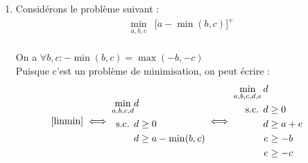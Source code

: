 \documentclass[a4paper,12pt]{article}
\begin{document}
\begin {enumerate}
\item{
    Considérons le problème suivant :
    \begin{equation}
        \begin{aligned}
            \min _{a, b, c} & \lbrack a - \min(b, c) \rbrack^+ \\
        \end{aligned}
        \label{linmin}
    \end{equation}

    On a $ \forall b, c : -\min(b, c) = \max(-b, -c) $ \\
    Puisque c'est un problème de minimisation, on peut écrire :
    \begin{equation}
        \eqref{linmin} \iff
        \begin{aligned}
            \min _{a, b, c, d} & d \\
            \text{ s.c. } & d \geq 0 \\
            & d \geq a - \min(b, c) \\
        \end{aligned}
        \iff
        \begin{aligned}
            \min _{a, b, c, d, e} d \\
            \text{ s.c. }
            d &\geq 0 \\
            d &\geq a + e \\
            e &\geq -b \\
            e &\geq -c \\   
        \end{aligned}
    \end{equation}
}


\end{enumerate}
\end{document}
